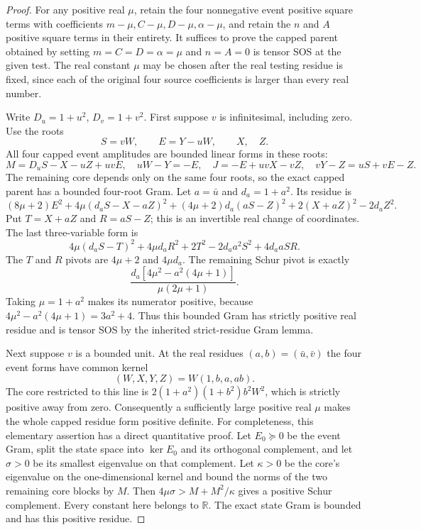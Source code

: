 \begin{proof}
For any positive real $\mu$, retain the four nonnegative event
positive square terms with coefficients $m-\mu,C-\mu,D-\mu,\alpha-\mu$, and
retain the $n$ and $A$ positive square terms in their entirety. It suffices to
prove the capped parent obtained by setting
$m=C=D=\alpha=\mu$ and $n=A=0$ is tensor SOS at the given test.
The real constant $\mu$ may be chosen after the real testing
residue is fixed, since each of the original four source
coefficients is larger than every real number.

Write $D_u=1+u^2$, $D_v=1+v^2$.
First suppose $v$ is infinitesimal, including zero. Use the roots
\[
 S=vW,\qquad E=Y-uW,\qquad X,\quad Z.
\]
All four capped event amplitudes are bounded linear forms in
these roots:
\[
 M=D_uS-X-uZ+uvE,\quad uW-Y=-E,\quad
 J=-E+uvX-vZ,\quad vY-Z=uS+vE-Z.
\]
The remaining core depends only on the same four roots, so the
exact capped parent has a bounded four-root Gram.
Let $a=\bar u$ and $d_a=1+a^2$. Its residue is
\[
 (8\mu+2)E^2+
 4\mu(d_aS-X-aZ)^2+(4\mu+2)d_a(aS-Z)^2
       +2(X+aZ)^2-2d_aZ^2.
\]
Put $T=X+aZ$ and $R=aS-Z$; this is an invertible real change of
coordinates. The last three-variable form is
\[
 4\mu(d_aS-T)^2+4\mu d_aR^2+2T^2
       -2d_a a^2S^2+4d_a aSR.
\]
The $T$ and $R$ pivots are $4\mu+2$ and $4\mu d_a$.
The remaining Schur pivot is exactly
\[
 \frac{d_a[4\mu^2-a^2(4\mu+1)]}{\mu(2\mu+1)}.
\]
Taking $\mu=1+a^2$ makes its numerator positive, because
$4\mu^2-a^2(4\mu+1)=3a^2+4$.
Thus this bounded Gram has strictly positive real residue and
is tensor SOS by the inherited strict-residue Gram lemma.

Next suppose $v$ is a bounded unit. At the real residues
$(a,b)=(\bar u,\bar v)$ the four event forms have common kernel
\[
 (W,X,Y,Z)=W(1,b,a,ab).
\]
The core restricted to this line is
$2(1+a^2)(1+b^2)b^2W^2$, which is strictly positive away from zero.
Consequently a sufficiently large positive real $\mu$ makes the
whole capped residue form positive definite. For completeness,
this elementary assertion has a direct quantitative proof.
Let $E_0\succeq0$ be the event Gram, split the state space into
$\ker E_0$ and its orthogonal complement, and let $\sigma>0$ be
its smallest eigenvalue on that complement. Let $\kappa>0$ be
the core's eigenvalue on the one-dimensional kernel and bound
the norms of the two remaining core blocks by $M$.
Then $4\mu\sigma>M+M^2/\kappa$ gives a positive Schur
complement. Every constant here belongs to $\mathbb R$.
The exact state Gram is bounded and has this positive residue.


\end{proof}
